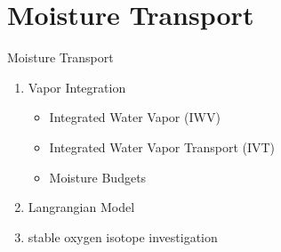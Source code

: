 \section{Moisture Transport}

\begin{frame}{Moisture Transport}

\begin{enumerate}
  \item Vapor Integration
    \begin{itemize}
      \item Integrated Water Vapor (IWV)
      \item Integrated Water Vapor Transport (IVT) \cite{zhu_proposed_1998, sousa_north_2020, jiang_impact_2017, ayantobo_integrated_2022, allan_diagnosing_2016, ralph_dropsonde_2017}
      \item Moisture Budgets 
    \end{itemize}
  \item Langrangian Model
  \item stable oxygen isotope investigation 
  
\end{enumerate}
  
\end{frame}
